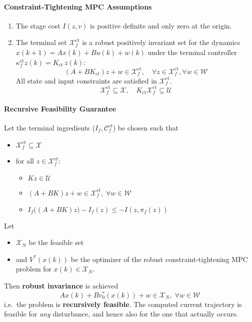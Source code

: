 \paragraph{Constraint-Tightening MPC Assumptions}
\begin{enumerate}
    \item The stage cost $I(z,v)$ is positive definite and only zero at the origin.
    \item The terminal set $\mathcal{X}_f^{\mathrm{ct}}$ is a robust positively invariant set for the dynamics $x(k+1) = Ax(k) + Bu(k) + w(k)$ under the terminal controller $\kappa_f^{\mathrm{ct}}z(k) = K_{\mathrm{ct}}\, z(k)$:
          \begin{equation*}
              (A + BK_{ct})z + w \in \mathcal{X}_f^{\mathrm{ct}}, \quad\forall z \in \mathcal{X}_f^{\mathrm{ct}}, \forall w \in \mathcal{W}
          \end{equation*}
          All state and input constraints are satisfied in $\mathcal{X}_f^{\mathrm{ct}}$.
          \begin{equation*}
              \mathcal{X}_f^{\mathrm{ct}} \subseteq \mathcal{X}, \quad K_{\mathrm{ct}} \mathcal{X}_f^{\mathrm{ct}}\subseteq \mathcal{U}
          \end{equation*}
\end{enumerate}

\paragraph{Recursive Feasibility Guarantee}

Let the terminal ingredients ($I_f, \mathcal{C}_f^{ct}$) be chosen such that
\begin{itemize}
    \item $\mathcal{X}_f^{\mathrm{ct}}\subseteq \mathcal{X}$
    \item for all $z\in \mathcal{X}_f^{ct}$:
          \begin{itemize}
              \item $Kz \in \mathcal{U}$
              \item $(A+BK) z + w \in \mathcal{X}_f^{ct}, \; \forall w \in \mathcal{W}$
              \item $I_f\bigl((A+BK)z\bigr) - I_f(z) \leq -I(z, \pi_f(z))$
          \end{itemize}
\end{itemize}
\newpar{}
Let
\begin{itemize}
    \item $\mathcal{X}_N$ be the feasible set
    \item and $V^*(x(k))$ be the optimizer of the robust constraint-tightening MPC problem for $x(k)\in\mathcal{X}_N$.
\end{itemize}
\newpar{}
Then \textbf{robust invariance} is achieved
\begin{equation*}
    Ax(k) + Bv_0^*(x(k)) + w \in \mathcal{X}_N, \; \forall w \in \mathcal{W}
\end{equation*}
i.e.\ the problem is \textbf{recursively feasible}.
\newpar{}
The computed current trajectory is feasible for \textit{any} disturbance, and hence also for the one that actually occurs.

